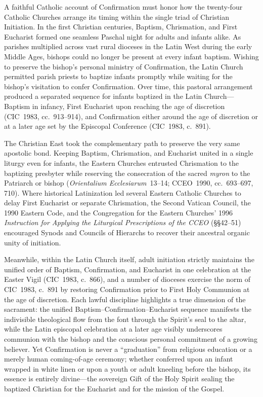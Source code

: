 A faithful Catholic account of Confirmation must honor how the twenty-four Catholic Churches  arrange its timing within the single triad of Christian Initiation. In the first Christian centuries, Baptism, Chrismation, and First Eucharist formed one seamless Paschal night for adults and infants alike. As parishes multiplied across vast rural dioceses in the Latin West during the early Middle Ages, bishops could no longer be present at every infant baptism. Wishing to preserve the bishop's personal ministry of Confirmation, the Latin Church permitted parish priests to baptize infants promptly while waiting for the bishop's visitation to confer Confirmation. Over time, this pastoral arrangement produced a separated sequence for infants baptized in the Latin Church---Baptism in infancy, First Eucharist upon reaching the age of discretion (CIC~1983, cc.~913--914), and Confirmation either around the age of discretion or at a later age set by the Episcopal Conference (CIC~1983, c.~891).

The Christian East took the complementary path to preserve the very same apostolic bond. Keeping Baptism, Chrismation, and Eucharist united in a single liturgy even for infants, the Eastern Churches entrusted Chrismation to the baptizing presbyter while reserving the consecration of the sacred \emph{myron} to the Patriarch or bishop (\emph{Orientalium Ecclesiarum}~13--14; CCEO~1990, cc.~693--697, 710). Where historical Latinization led several Eastern Catholic Churches to delay First Eucharist or separate Chrismation, the Second Vatican Council, the 1990 Eastern Code, and the Congregation for the Eastern Churches' 1996 \emph{Instruction for Applying the Liturgical Prescriptions of the CCEO} (\S\S42--51) encouraged Synods and Councils of Hierarchs to recover their ancestral organic unity of initiation.

Meanwhile, within the Latin Church itself, adult initiation strictly maintains the unified order of Baptism, Confirmation, and Eucharist in one celebration at the Easter Vigil (CIC~1983, c.~866), and a number of dioceses exercise the norm of CIC~1983, c.~891 by restoring Confirmation prior to First Holy Communion at the age of discretion. Each lawful discipline highlights a true dimension of the sacrament: the unified Baptism--Confirmation--Eucharist sequence manifests the indivisible theological flow from the font through the Spirit's seal to the altar, while the Latin episcopal celebration at a later age visibly underscores communion with the bishop and the conscious personal commitment of a growing believer. Yet Confirmation is never a ``graduation'' from religious education or a merely human coming-of-age ceremony; whether conferred upon an infant wrapped in white linen or upon a youth or adult kneeling before the bishop, its essence is entirely divine---the sovereign Gift of the Holy Spirit sealing the baptized Christian for the Eucharist and for the mission of the Gospel.
